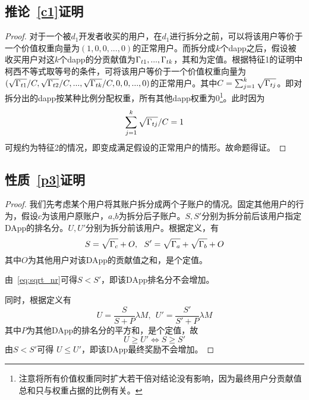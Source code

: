 \subsection{推论~\ref{c1}证明}
\label{subsection:proof3}
\begin{proof}
	对于一个被$d_1$开发者收买的用户，在$d_1$进行拆分之前，可以将该用户等价于一个价值权重向量为$(1,0,0,...,0)$的正常用户。而拆分成$k$个dapp之后，假设被收买用户对这$k$个dapp的分贡献值为$\Gamma_{t1},...,\Gamma_{tk}$，其和为定值。根据特征1的证明中柯西不等式取等号的条件，可将该用户等价于一个价值权重向量为$(\sqrt{\Gamma_{t1}}/C,\sqrt{\Gamma_{t2}}/C,...,\sqrt{\Gamma_{tk}}/C,0,0,...,0)$的正常用户。其中$C=\sum_{j=1}^k \sqrt{\Gamma_{tj}}$。即对拆分出的dapp按某种比例分配权重，所有其他dapp权重为0\footnote{注意将所有价值权重同时扩大若干倍对结论没有影响，因为最终用户分贡献值总和只与权重占据的比例有关。}。此时因为
	$$\sum_{j=1}^k \sqrt{\Gamma_{tj}}/C =1$$
	可规约为特征2的情况，即变成满足假设的正常用户的情形。故命题得证。
\end{proof}

\subsection{性质~\ref{p3}证明}
\begin{proof}
我们先考虑某个用户将其账户拆分成两个子账户的情况。固定其他用户的行为，假设$c$为该用户原账户，$a$,$b$为拆分后子账户。$S,S'$分别为拆分前后该用户指定DApp的排名分。$U,U'$分别为拆分前该用户。根据定义，有
$$S= \sqrt{\Gamma_c}+O,~~S'=\sqrt{\Gamma_a}+\sqrt{\Gamma_b}+O$$
其中$O$为其他用户对该DApp的贡献值之和，是个定值。

由~\ref{eq:sqrt_nr}可得$S < S'$，即该DApp排名分不会增加。

同时，根据定义有
$$U = \frac{S}{S+P}\lambda M,~~U' = \frac{S'}{S'+P} \lambda M$$
其中$P$为其他DApp的排名分的平方和，是个定值，故
$$U \geq U' \Leftrightarrow S \geq S'$$
由$S < S' $可得 $U \leq U'$，即该DApp最终奖励不会增加。
\end{proof}